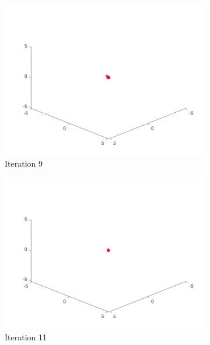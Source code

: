 \begin{figure}
\begin{subfigure}[b]{0.4\textwidth}
    \includegraphics[width=\textwidth]{img/smpl/fn4d/loa-iter-9}
    \caption{Iteration 9}
    \label{fig:s3-iter-4}
  \end{subfigure}
  \begin{subfigure}[b]{0.4\textwidth}
    \includegraphics[width=\textwidth]{img/smpl/fn4d/loa-iter-11}
    \caption{Iteration 11}
    \label{fig:s3-iter-5}
  \end{subfigure}
  \begin{subfigure}[b]{0.4\textwidth}

\end{subfigure}
\end{figure}
